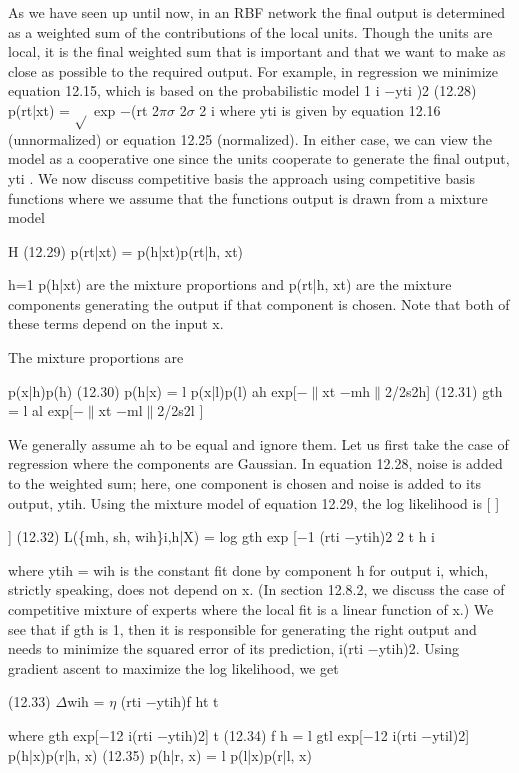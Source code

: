 As we have seen up until now, in an RBF network the final output is determined as a weighted sum of the contributions of the local units. Though the units are local, it is the final weighted sum that is important and that we want to make as close as possible to the required output. For example, in regression we minimize equation 12.15, which is based on the probabilistic model 1 i $-$yti )2 (12.28) p(rt|xt) = $\sqrt{}$ exp $-$(rt 2$\pi$$\sigma$ 2$\sigma$ 2 i where yti is given by equation 12.16 (unnormalized) or equation 12.25 (normalized). In either case, we can view the model as a cooperative one since the units cooperate to generate the final output, yti . We now discuss competitive basis the approach using competitive basis functions where we assume that the functions output is drawn from a mixture model

H (12.29) p(rt|xt) = p(h|xt)p(rt|h, xt)

h=1 p(h|xt) are the mixture proportions and p(rt|h, xt) are the mixture components generating the output if that component is chosen. Note that both of these terms depend on the input x.

The mixture proportions are

p(x|h)p(h) (12.30) p(h|x) = l p(x|l)p(l) ah exp[$-$$\parallel$xt $-$mh$\parallel$2/2s2h] (12.31) gth = l al exp[$-$$\parallel$xt $-$ml$\parallel$2/2s2l ]

We generally assume ah to be equal and ignore them. Let us first take the case of regression where the components are Gaussian. In equation 12.28, noise is added to the weighted sum; here, one component is chosen and noise is added to its output, ytih. Using the mixture model of equation 12.29, the log likelihood is [ ]

] (12.32) L(\{mh, sh, wih\}i,h|X) = log gth exp [$-$1 (rti $-$ytih)2 2 t h i

where ytih = wih is the constant fit done by component h for output i, which, strictly speaking, does not depend on x. (In section 12.8.2, we discuss the case of competitive mixture of experts where the local fit is a linear function of x.) We see that if gth is 1, then it is responsible for generating the right output and needs to minimize the squared error of its prediction, i(rti $-$ytih)2. Using gradient ascent to maximize the log likelihood, we get

(12.33) $\Delta$wih = $\eta$ (rti $-$ytih)f ht t

where gth exp[$-$12 i(rti $-$ytih)2] t (12.34) f h = l gtl exp[$-$12 i(rti $-$ytil)2] p(h|x)p(r|h, x) (12.35) p(h|r, x) = l p(l|x)p(r|l, x)

